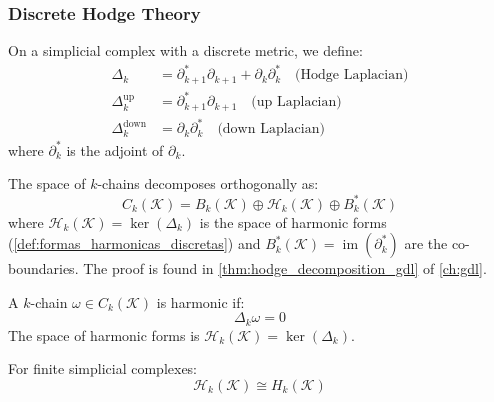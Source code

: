 \subsubsection{Discrete Hodge Theory}

\begin{definition}\label{def:operadores_hodge_discretos}
On a simplicial complex with a discrete metric, we define:
\begin{align}
    \Delta_k &= \partial_{k+1}^* \partial_{k+1} + \partial_k \partial_k^* \quad \text{(Hodge Laplacian)} \\
    \Delta_k^{\text{up}} &= \partial_{k+1}^* \partial_{k+1} \quad \text{(up Laplacian)} \\
    \Delta_k^{\text{down}} &= \partial_k \partial_k^* \quad \text{(down Laplacian)}
\end{align}
where $\partial_k^*$ is the adjoint of $\partial_k$.
\end{definition}

\begin{theorem}\label{thm:descomposicion_hodge_discreta}
The space of $k$-chains decomposes orthogonally as:
\begin{equation}
    C_k(\mathcal{K}) = B_k(\mathcal{K}) \oplus \mathcal{H}_k(\mathcal{K}) \oplus B_k^*(\mathcal{K})
\end{equation}
where $\mathcal{H}_k(\mathcal{K}) = \ker(\Delta_k)$ is the space of harmonic forms (\autoref{def:formas_harmonicas_discretas}) and $B_k^*(\mathcal{K}) = \operatorname{im}(\partial_k^*)$ are the co-boundaries. The proof is found in \autoref{thm:hodge_decomposition_gdl} of \autoref{ch:gdl}.
\end{theorem}

\begin{definition}\label{def:formas_harmonicas_discretas}
A $k$-chain $\omega \in C_k(\mathcal{K})$ is harmonic if:
\begin{equation}
    \Delta_k \omega = 0
\end{equation}
The space of harmonic forms is $\mathcal{H}_k(\mathcal{K}) = \ker(\Delta_k)$.
\end{definition}

\begin{theorem}\label{thm:isomorfismo_harmonico_homologia}
For finite simplicial complexes:
\begin{equation}
    \mathcal{H}_k(\mathcal{K}) \cong H_k(\mathcal{K})
\end{equation}
\end{theorem}

